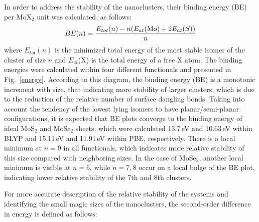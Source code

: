 \documentclass[nofootinbib,10pt,aip,twocolumn,showpacs]{revtex4-1}
\begin{document}
In order to address the stability of the nanoclusters, 
their binding energy (BE) per MoX$_2$ unit was calculated, as follows:
%
\begin{equation}
BE(n)=\frac{E_{tot}(n)-n(E_{at}({\rm Mo})+2E_{at}(S))}{n}
\label{equ-BE}
\end{equation}
%
where $E_{tot}(n)$ is the minimized total energy of the most stable isomer of 
the cluster of size $n$ and $E_{at}$(X) is the total energy of a free X atom.
The binding energies were calculated within four different 
functionals and presented in Fig.~\ref{energy}.
According to this diagram, the binding energy (BE) is a monotonic increment with size, 
that indicating more stability of larger clusters, 
which is due to the reduction of the relative number of surface dangling bonds.
Taking into account the tendency of the lowest lying isomers to have 
planar/semi-planar configurations,
it is expected that BE plots converge to the binding energy of 
ideal MoS$_2$ and MoSe$_2$ sheets, 
which were calculated 13.7\,eV and 10.63\,eV within BLYP and 15.11\,eV and 
11.91\,eV within PBE, respectively.
There is a local minimum at $n=9$ in all functionals,
which indicates more relative stability of this size compared with neighboring sizes. 
In the case of MoSe$_2$, another local minimum is visible at $n = 6$,
while $n = 7,8$ occur on a local bulge of the BE plot, 
indicating lower relative stability of the 7th and 8th clusters.

For more accurate description of the relative stability of the systems
and identifying the small magic sizes of the nanoclusters, 
the second-order difference in energy is defined as follows:
\end{document}
